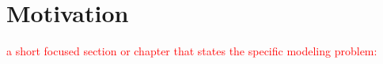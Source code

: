 
\chapter{Motivation}
\label{chap:motivation}


\textcolor{red}{a short focused section or chapter that states the specific modeling problem:}











